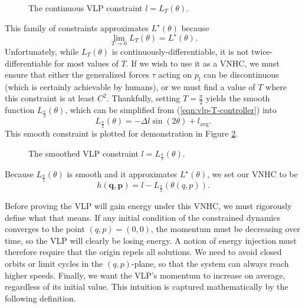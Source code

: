 \begin{figure}
   \centering
   
   \caption{The continuous VLP constraint \(l = L_T(\theta)\).}
   \label{fig:vlp-T-controller}
\end{figure}

This family of constraints approximates \(L^\star(\theta)\) because 
\[
   \lim\limits_{T \rightarrow 0} L_T(\theta) = L^\star(\theta)
   .
\]
Unfortunately, while \(L_T(\theta)\) is continuously-differentiable, 
it is not twice-differentiable for most values of \(T\).
If we wish to use it as a VNHC, we must ensure that either the generalized
forces \(\tau\) acting on \(p_l\) can be discontinuous (which is certainly
achievable by humans), or we must find a value of \(T\) where this constraint is
at least \(C^2\).
Thankfully, setting \(T = \frac{\pi}{2}\) yields the smooth function 
\(L_{\frac{\pi}{2}}(\theta)\), which can be simplified from
(\ref{eqn:vlp-T-controller}) into
\begin{equation}\label{eqn:vlp-smoothed-controller}
   L_\frac{\pi}{2}(\theta) = -\Delta l \sin(2\theta) + l_{\text{avg}}
   .
\end{equation}
This smooth constraint is plotted for demonstration in Figure
\ref{fig:vlp-smoothed-controller}.

\begin{figure}
   \centering
   
   \caption{The smoothed VLP constraint \(l = L_\frac{\pi}{2}(\theta)\).}
   \label{fig:vlp-smoothed-controller}
\end{figure}

Because \(L_\frac{\pi}{2}(\theta)\) is smooth and it approximates
\(L^\star(\theta)\), we set our VNHC to be
\[
   h(\mathbf{q},\mathbf{p}) = l - L_\frac{\pi}{2}\left(\theta(q,p)\right)
   .
\]

Before proving the VLP will gain energy under this VNHC, 
we must rigorously define what that means.
If any initial condition of the constrained dynamics converges to the point
\((q,p) = (0,0)\), the momentum must be decreasing over time, so the VLP will
clearly be losing energy.
A notion of energy injection must therefore require that the origin repels all
solutions.
We need to avoid closed orbits or limit cycles in the \((q,p)\)-plane,
so that the system can always reach higher speeds. 
Finally, we want the VLP's momentum to increase on average, regardless of
its initial value.
This intuition is captured mathematically by the following definition.

